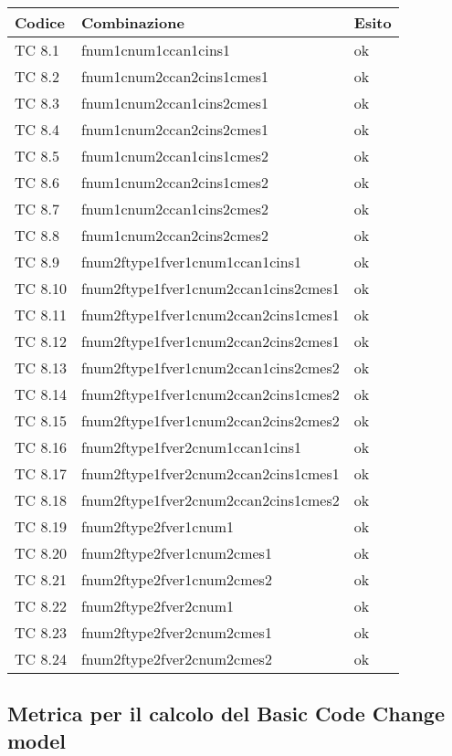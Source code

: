\begin{tabular}{|p{3cm}|p{7cm}|p{3cm}|}
	\hline
	\rowcolor{Gray}
	\textbf{Codice} & \textbf{Combinazione} & \textbf{Esito}\tabularnewline
	\hline
	TC 8.1			& fnum1cnum1ccan1cins1						& ok \tabularnewline
	\hline
	TC 8.2			& fnum1cnum2ccan2cins1cmes1					& ok \tabularnewline
	\hline
	TC 8.3			& fnum1cnum2ccan1cins2cmes1					& ok \tabularnewline
	\hline
	TC 8.4			& fnum1cnum2ccan2cins2cmes1					& ok \tabularnewline
	\hline
	TC 8.5			& fnum1cnum2ccan1cins1cmes2					& ok \tabularnewline
	\hline
	TC 8.6			& fnum1cnum2ccan2cins1cmes2					& ok \tabularnewline
	\hline
	TC 8.7			& fnum1cnum2ccan1cins2cmes2					& ok \tabularnewline
	\hline
	TC 8.8			& fnum1cnum2ccan2cins2cmes2					& ok \tabularnewline	
	\hline
	TC 8.9			& fnum2ftype1fver1cnum1ccan1cins1				& ok \tabularnewline
	\hline
	TC 8.10			& fnum2ftype1fver1cnum2ccan1cins2cmes1				& ok \tabularnewline
	\hline
	TC 8.11			& fnum2ftype1fver1cnum2ccan2cins1cmes1				& ok \tabularnewline
	\hline
	TC 8.12			& fnum2ftype1fver1cnum2ccan2cins2cmes1				& ok \tabularnewline
	\hline
	TC 8.13			& fnum2ftype1fver1cnum2ccan1cins2cmes2				& ok \tabularnewline
	\hline
	TC 8.14			& fnum2ftype1fver1cnum2ccan2cins1cmes2				& ok \tabularnewline
	\hline
	TC 8.15			& fnum2ftype1fver1cnum2ccan2cins2cmes2				& ok \tabularnewline
	\hline
	TC 8.16			& fnum2ftype1fver2cnum1ccan1cins1				& ok \tabularnewline
	\hline
	TC 8.17			& fnum2ftype1fver2cnum2ccan2cins1cmes1				& ok \tabularnewline
	\hline
	TC 8.18			& fnum2ftype1fver2cnum2ccan2cins1cmes2				& ok \tabularnewline
	\hline
	TC 8.19			& fnum2ftype2fver1cnum1						& ok \tabularnewline
	\hline
	TC 8.20			& fnum2ftype2fver1cnum2cmes1					& ok \tabularnewline
	\hline
	TC 8.21			& fnum2ftype2fver1cnum2cmes2					& ok \tabularnewline
	\hline
	TC 8.22			& fnum2ftype2fver2cnum1						& ok \tabularnewline
	\hline
	TC 8.23			& fnum2ftype2fver2cnum2cmes1					& ok \tabularnewline
	\hline
	TC 8.24			& fnum2ftype2fver2cnum2cmes2					& ok \tabularnewline
	\hline
\end{tabular}
\clearpage




\subsection{Metrica per il calcolo del Basic Code Change model}
		
